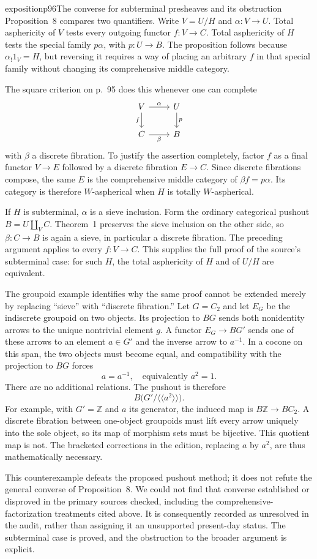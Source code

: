 \begin{dcomment}{exposition}{p96}{The converse for subterminal presheaves and its obstruction}
Proposition~8 compares two quantifiers. Write $V=U/H$ and $\alpha:V\to U$. Total asphericity of $V$ tests every outgoing functor $f:V\to C$. Total asphericity of $H$ tests the special family $p\alpha$, with $p:U\to B$. The proposition follows because $\alpha_!1_V=H$, but reversing it requires a way of placing an arbitrary $f$ in that special family without changing its comprehensive middle category.

The square criterion on p.~95 does this whenever one can complete
\[
\begin{tikzcd}
V\arrow[r,"\alpha"]\arrow[d,"f"']&U\arrow[d,"p"]\\
C\arrow[r,"\beta"']&B
\end{tikzcd}
\]
with $\beta$ a discrete fibration. To justify the assertion completely, factor $f$ as a final functor $V\to E$ followed by a discrete fibration $E\to C$. Since discrete fibrations compose, the same $E$ is the comprehensive middle category of $\beta f=p\alpha$. Its category is therefore $W$-aspherical when $H$ is totally $W$-aspherical.

If $H$ is subterminal, $\alpha$ is a sieve inclusion. Form the ordinary categorical pushout $B=U\amalg_V C$. Theorem~1 preserves the sieve inclusion on the other side, so $\beta:C\to B$ is again a sieve, in particular a discrete fibration. The preceding argument applies to every $f:V\to C$. This supplies the full proof of the source's subterminal case: for such $H$, the total asphericity of $H$ and of $U/H$ are equivalent.

The groupoid example identifies why the same proof cannot be extended merely by replacing ``sieve'' with ``discrete fibration.'' Let $G=C_2$ and let $E_G$ be the indiscrete groupoid on two objects. Its projection to $BG$ sends both nonidentity arrows to the unique nontrivial element $g$. A functor $E_G\to BG'$ sends one of these arrows to an element $a\in G'$ and the inverse arrow to $a^{-1}$. In a cocone on this span, the two objects must become equal, and compatibility with the projection to $BG$ forces
\[
a=a^{-1},\quad\text{equivalently }a^2=1.
\]
There are no additional relations. The pushout is therefore
\[
B\bigl(G'/\langle\!\langle a^2\rangle\!\rangle\bigr).
\]
For example, with $G'=\mathbb Z$ and $a$ its generator, the induced map is $B\mathbb Z\to BC_2$. A discrete fibration between one-object groupoids must lift every arrow uniquely into the sole object, so its map of morphism sets must be bijective. This quotient map is not. The bracketed corrections in the edition, replacing $a$ by $a^2$, are thus mathematically necessary.

This counterexample defeats the proposed pushout method; it does not refute the general converse of Proposition~8. We could not find that converse established or disproved in the primary sources checked, including the comprehensive-factorization treatments cited above. It is consequently recorded as unresolved in the audit, rather than assigning it an unsupported present-day status. The subterminal case is proved, and the obstruction to the broader argument is explicit.
\end{dcomment}

